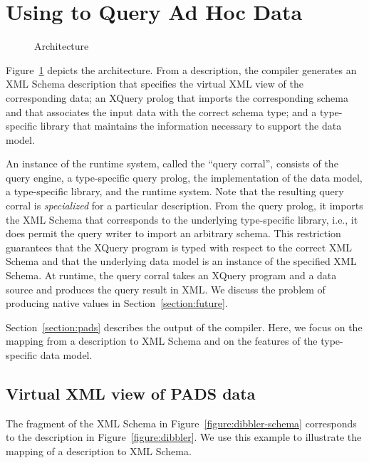 \section{Using \padx{} to Query Ad Hoc Data}
\label{section:padx}

\begin{figure}
\begin{center}
\end{center}
\caption{\padx{} Architecture}
\label{figure:padx-arch}
\end{figure}

Figure~\ref{figure:padx-arch} depicts the \padx{} architecture.  From
a \pads{} description, the compiler generates an XML Schema
description that specifies the virtual XML view of the corresponding
\pads{} data; an XQuery prolog that imports the corresponding schema
and that associates the input data with the correct schema type; and a
type-specific library that maintains the information necessary to
support the \padx{} data model.

An instance of the \padx{} runtime system, called the ``query
corral'', consists of the \Galax{} query engine, a type-specific query
prolog, the \padx{} implementation of the \Galax{} data model, a
type-specific \padx{} library, and the \pads{} runtime system.  Note
that the resulting query corral is \emph{specialized} for a particular
\pads{} description.  From the query prolog, it imports the XML Schema
that corresponds to the underlying type-specific library, i.e., it
does permit the query writer to import an arbitrary schema.  This
restriction guarantees that the XQuery program is typed with respect
to the correct XML Schema and that the underlying data model is an
instance of the specified XML Schema.  At runtime, the query corral
takes an XQuery program and a \pads{} data source and produces the
query result in XML.  We discuss the problem of producing native
\pads{} values in Section~\ref{section:future}. 

Section~\ref{section:pads} describes the output of the \pads{}
compiler.  Here, we focus on the mapping from a description to XML
Schema and on the features of the type-specific data model.

\subsection{Virtual XML view of PADS data}

The fragment of the XML Schema in Figure~\ref{figure:dibbler-schema}
corresponds to the description in Figure~\ref{figure:dibbler}.  We use
this example to illustrate the mapping of a \pads{} description to XML
Schema.

